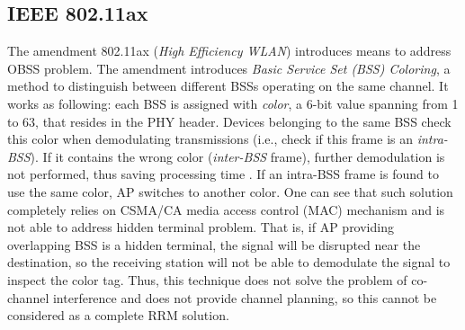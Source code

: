 \subsection {IEEE 802.11ax}
\label{chap:lr:sec:80211ax}

The amendment 802.11ax \cite{80211ax} (\textit{High Efficiency WLAN}) introduces means to address OBSS problem. The amendment introduces \textit{Basic Service Set (BSS) Coloring}, a method to distinguish between different BSSs operating on the same channel. It works as following: each BSS is assigned with \textit{color}, a 6-bit value spanning from 1 to 63, that resides in the PHY header. Devices belonging to the same BSS check this color when demodulating transmissions (i.e., check if this frame is an \textit{intra-BSS}). If it contains the wrong color (\textit{inter-BSS} frame), further demodulation is not performed, thus saving processing time \cite{CiscoCatalyst9800}.
If an intra-BSS frame is found to use the same color, AP switches to another color.
One can see that such solution completely relies on CSMA/CA media access control (MAC) mechanism and is not able to address hidden terminal problem. That is, if AP providing overlapping BSS is a hidden terminal, the signal will be disrupted near the destination, so the receiving station will not be able to demodulate the signal to inspect the color tag.
Thus, this technique does not solve the problem of co-channel interference and does not provide channel planning, so this cannot be considered as a complete RRM solution.



